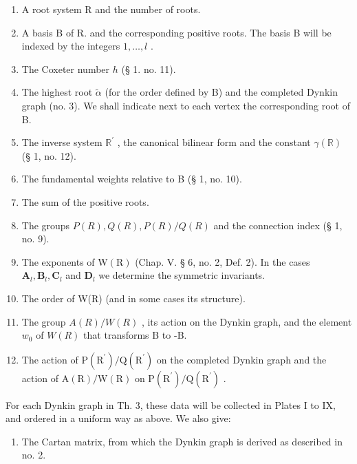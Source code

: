\begin{enumerate}
\def\labelenumi{(\Roman{enumi})}
\item
  A root system R and the number of roots.
\item
  A basis B of R. and the corresponding positive roots. The basis B will be indexed by the integers \(1,\ldots,l\) .
\item
  The Coxeter number \(h\) (§ 1. no. 11).
\item
  The highest root \(\tilde{\alpha}\) (for the order defined by B) and the completed Dynkin graph (no. 3). We shall indicate next to each vertex the corresponding root of B.
\item
  The inverse system \(\mathbb{R}^{\prime}\) , the canonical bilinear form and the constant \(\gamma(\mathbb{R})\) (§ 1, no. 12).
\item
  The fundamental weights relative to B (§ 1, no. 10).
\item
  The sum of the positive roots.
\item
  The groups \(P(R), Q(R), P(R)/Q(R)\) and the connection index (§ 1, no. 9).
\item
  The exponents of \(\mathrm{W}(\mathrm{R})\) (Chap. V. § 6, no. 2, Def. 2). In the cases \(\mathbf{A}_l, \mathbf{B}_l, \mathbf{C}_l\) and \(\mathbf{D}_l\) we determine the symmetric invariants.
\item
  The order of W(R) (and in some cases its structure).
\item
  The group \(A(R)/W(R)\) , its action on the Dynkin graph, and the element \(w_{0}\) of \(W(R)\) that transforms B to -B.
\item
  The action of \(\mathrm{P}(\mathrm{R}^{\prime})/\mathrm{Q}(\mathrm{R}^{\prime})\) on the completed Dynkin graph and the action of \(\mathrm{A}(\mathrm{R})/\mathrm{W}(\mathrm{R})\) on \(\mathrm{P}(\mathrm{R}^{\prime})/\mathrm{Q}(\mathrm{R}^{\prime})\) .
\end{enumerate}

For each Dynkin graph in Th. 3, these data will be collected in Plates I to IX, and ordered in a uniform way as above. We also give:

\begin{enumerate}
\def\labelenumi{(\Roman{enumi})}
\setcounter{enumi}{12}
\tightlist
\item
  The Cartan matrix, from which the Dynkin graph is derived as described in no. 2.
\end{enumerate}

